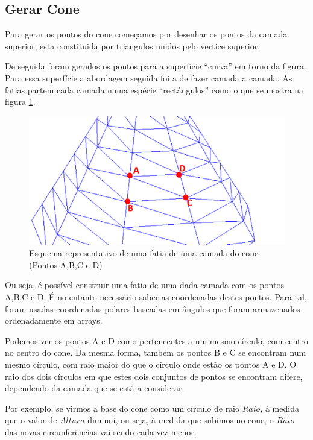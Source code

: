 \subsection{Gerar Cone}

Para gerar os pontos do cone começamos por desenhar os pontos da camada superior, esta constituida por triangulos unidos pelo vertice superior.


De seguida foram gerados os pontos para a superfície ``curva'' em torno da figura. Para essa superfície a abordagem seguida foi a de fazer camada a camada. As fatias partem cada camada numa espécie ``rectângulos'' como o que se mostra na figura \ref{p1:fig:p3_seccaoCone_edit}.


\begin{figure}[<+htpb+>]
	\centering
	\includegraphics[scale=0.5]{imagens/p3_seccaoCone_edit.png}
	\caption{Esquema representativo de uma fatia de uma camada do cone (Pontos A,B,C e D)}
	\label{p1:fig:p3_seccaoCone_edit}
\end{figure}

Ou seja, é possível construir uma fatia de uma dada camada com os pontos A,B,C e D. É no entanto necessário saber as coordenadas destes pontos. Para tal, foram usadas coordenadas polares baseadas em ângulos que foram armazenados ordenadamente em arrays.  

Podemos ver os pontos A e D como pertencentes a um mesmo círculo, com centro no centro do cone. Da mesma forma, também os pontos B e C se encontram num mesmo círculo, com raio maior do que o círculo onde estão os pontos A e D. O raio dos dois círculos em que estes dois conjuntos de pontos se encontram difere, dependendo da camada que se está a considerar. 


Por exemplo, se virmos a base do cone como um círculo de raio $Raio$, à medida que o valor de $Altura$ diminui, ou seja, à medida que subimos no cone, o $Raio$ das novas circunferências vai sendo cada vez menor.

